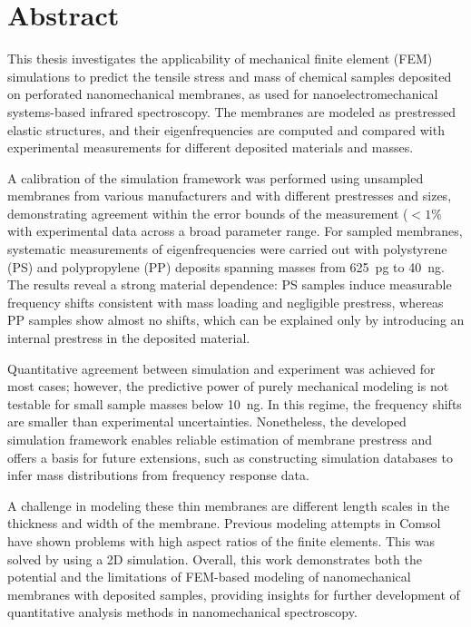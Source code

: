 \chapter*{Abstract}
This thesis investigates the applicability of mechanical finite element (\acf{FEM}) simulations to predict the tensile stress and mass of chemical samples deposited on perforated nanomechanical membranes, as used for nanoelectromechanical systems-based infrared spectroscopy. The membranes are modeled as prestressed elastic structures, and their eigenfrequencies are computed and compared with experimental measurements for different deposited materials and masses. 

A calibration of the simulation framework was performed using unsampled membranes from various manufacturers and with different prestresses and sizes, demonstrating agreement within the error bounds of the measurement ($<1\%$ with experimental data across a broad parameter range. For sampled membranes, systematic measurements of eigenfrequencies were carried out with polystyrene (PS) and polypropylene (PP) deposits spanning masses from \SI{625}{\pico\gram} to \SI{40}{\nano\gram}. The results reveal a strong material dependence: PS samples induce measurable frequency shifts consistent with mass loading and negligible prestress, whereas PP samples show almost no shifts, which can be explained only by introducing an internal prestress in the deposited material. 

Quantitative agreement between simulation and experiment was achieved for most cases; however, the predictive power of purely mechanical modeling is not testable for small sample masses below \SI{10}{\nano\gram}. In this regime, the frequency shifts are smaller than experimental uncertainties. Nonetheless, the developed simulation framework enables reliable estimation of membrane prestress and offers a basis for future extensions, such as constructing simulation databases to infer mass distributions from frequency response data. 

A challenge in modeling these thin membranes are different length scales in the thickness and width of the membrane. Previous modeling attempts in Comsol have shown problems with high aspect ratios of the finite elements. This was solved by using a 2D simulation. Overall, this work demonstrates both the potential and the limitations of \acf{FEM}-based modeling of nanomechanical membranes with deposited samples, providing insights for further development of quantitative analysis methods in nanomechanical spectroscopy.

